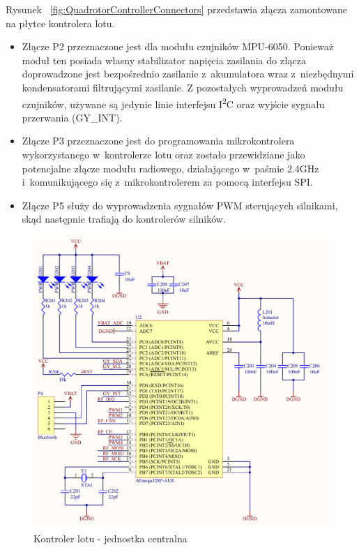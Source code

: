 Rysunek ~\ref{fig:QuadrotorControllerConnectors} przedstawia złącza zamontowane na płytce kontrolera lotu. 
\begin{itemize}
	\item Złącze P2 przeznaczone jest dla modułu czujników MPU-6050. Ponieważ moduł ten posiada własny stabilizator napięcia zasilania do złącza doprowadzone jest bezpośrednio zasilanie z~akumulatora wraz z~niezbędnymi kondensatorami filtrującymi zasilanie. Z pozostałych wyprowadzeń modułu czujników, używane są jedynie linie interfejsu I\textsuperscript{2}C oraz wyjście sygnału przerwania (GY\_INT).
	\item Złącze P3 przeznaczone jest do programowania mikrokontrolera wykorzystanego w~kontrolerze lotu oraz zostało przewidziane jako potencjalne złącze modułu radiowego, działającego w~paśmie 2.4GHz i~komunikującego się z~mikrokontrolerem za pomocą interfejsu SPI.  
	\item Złącze P5 służy do wyprowadzenia sygnałów PWM sterujących silnikami, skąd następnie trafiają do kontrolerów silników.
\end{itemize}

\begin{figure}[H]
	\centering
	\includegraphics[scale=0.37]{Pictures/QuadroController_Main_C.png}
		\caption[Kontroler lotu - jednostka centralna]{Kontroler lotu - jednostka centralna}
	\label{fig:QuadrotorControllerMain}
\end{figure}

